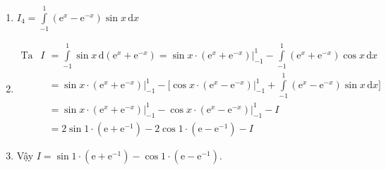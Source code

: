 \begin{bt}
{\begin{enumerate}
			\item $I_4=\displaystyle \int \limits_{-1}^{1} \left(\mathrm{e}^{x}-\mathrm{e}^{-x} \right) \sin{x}\mathrm{\,d}x$
			\item[] $\begin{aligned} \text{Ta có: }
			\displaystyle I &=\int\limits_{-1}^{1} \sin x \mathrm{\,d} \left(\mathrm{e}^{x}+\mathrm{e}^{-x} \right)=\sin x\cdot \left(\mathrm{e}^{x}+\mathrm{e}^{-x} \right)\Big|_{-1}^{1}-\int\limits_{-1}^{1} \left(\mathrm{e}^{x}+\mathrm{e}^{-x} \right) \cos{x} \mathrm{\,d} x \\& =\sin x\cdot \left(\mathrm{e}^{x}+\mathrm{e}^{-x} \right)\Big|_{-1}^{1}-\Bigg[ \cos x\cdot \left(\mathrm{e}^{x}-\mathrm{e}^{-x} \right)\Big|_{-1}^{1}+\int\limits_{-1}^{1} \left(\mathrm{e}^{x}-\mathrm{e}^{-x} \right) \sin{x} \mathrm{\,d} x\Bigg]\\&=\sin x\cdot \left(\mathrm{e}^{x}+\mathrm{e}^{-x} \right)\Big|_{-1}^{1}-\cos x\cdot \left(\mathrm{e}^{x}-\mathrm{e}^{-x} \right)\Big|_{-1}^{1}-I\\&=2\sin 1\cdot(\mathrm{e}+\mathrm{e}^{-1})-2\cos 1\cdot(\mathrm{e}-\mathrm{e}^{-1})-I
			\end{aligned}$
			\item[] Vậy $I=\sin 1\cdot(\mathrm{e}+\mathrm{e}^{-1})-\cos 1\cdot(\mathrm{e}-\mathrm{e}^{-1})$.
		\end{enumerate}
	}
\end{bt}

